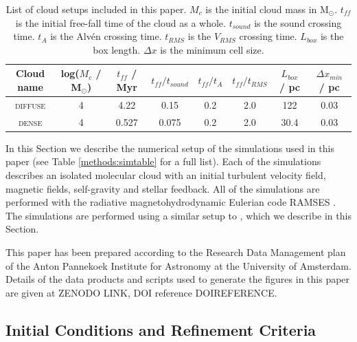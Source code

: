 \documentclass[a4paper,fleqn,usenatbib]{mnras}
\newcommand{\Msolar}{M$_{\odot}$\xspace}
\begin{document}
\begin{table}
	\centering
	\caption{List of cloud setups included in this paper. $M_c$ is the initial cloud mass in \Msolar. $t_{ff}$ is the initial free-fall time of the cloud as a whole. $t_{sound}$ is the sound crossing time. $t_{A}$ is the Alv\'en crossing time. $t_{RMS}$ is the $V_{RMS}$ crossing time. $L_{box}$ is the box length. $\Delta x$ is the minimum cell size.}
	\label{methods:cloudtable}
	\begin{tabular}{cccccccc} %
		\hline
		Cloud name & log($M_c$ / M$_\odot$) & $t_{ff}$ / Myr & $t_{ff}/t_{sound}$ & $t_{ff}/t_{A}$ & $t_{ff}/t_{RMS}$ & $L_{box}$ / pc & $\Delta x_{min}$ / pc \\
		\hline
		\textsc{diffuse} & 4                & 4.22            & 0.15               & 0.2            & 2.0              & 122            & 0.03 \\
		\textsc{dense}   & 4                & 0.527           & 0.075              & 0.2            & 2.0              & 30.4            & 0.03 \\
	\end{tabular}
\end{table}

In this Section we describe the numerical setup of the simulations used in this paper (see Table \ref{methods:simtable} for a full list). Each of the simulations describes an isolated molecular cloud with an initial turbulent velocity field, magnetic fields, self-gravity and stellar feedback. All of the simulations are performed with the radiative magnetohydrodynamic Eulerian \AMR code \textsc{RAMSES} \citep{Teyssier2002,Fromang2006,Rosdahl2013}. The simulations are performed using a similar setup to \citet{Geen2018}, which we describe in this Section. 

This paper has been prepared according to the Research Data Management plan of the Anton Pannekoek Institute for Astronomy at the University of Amsterdam. Details of the data products and scripts used to generate the figures in this paper are given at ZENODO LINK, DOI reference DOIREFERENCE.

\subsection{Initial Conditions and Refinement Criteria}
\end{document}
